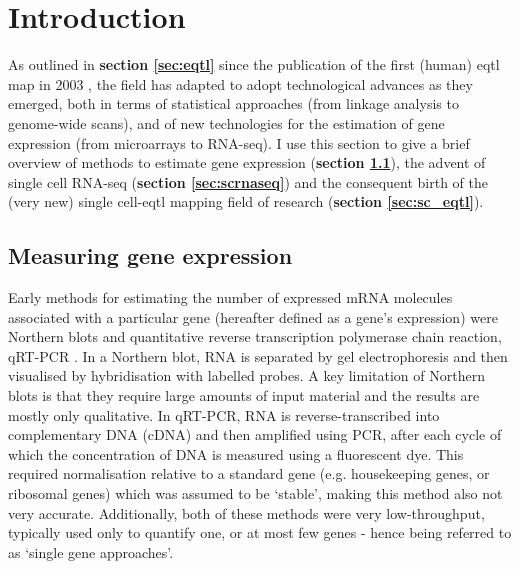 \newpage

\section{Introduction}

As outlined in \textbf{section 
\ref{sec:eqtl}} 
since the publication of the first (human) \gls{eqtl} map in 2003 \cite{schadt2003genetics}, the field has adapted to adopt technological advances as they emerged, both in terms of statistical approaches (from linkage analysis to genome-wide scans), and of new technologies for the estimation of gene expression (from microarrays to RNA-seq).
I use this section to give a brief overview of methods to estimate gene expression (\textbf{section \ref{sec:gene_expression}}), the advent of single cell RNA-seq (\textbf{section \ref{sec:scrnaseq}}) and the consequent birth of the (very new) single cell-\gls{eqtl} mapping field of research (\textbf{section \ref{sec:sc_eqtl}}). 

\subsection{Measuring gene expression}
\label{sec:gene_expression}

Early methods for estimating the number of expressed mRNA molecules associated with a particular gene (hereafter defined as a gene's expression)
were Northern blots \cite{alwine1977method} and quantitative reverse transcription polymerase chain reaction, qRT-PCR \cite{gibson1996novel}. 
In a Northern blot, RNA is separated by gel electrophoresis and then visualised by hybridisation with labelled probes. 
A key limitation of Northern blots is that they require large amounts of input material and the results are mostly only qualitative.
In qRT-PCR, RNA is reverse-transcribed into complementary DNA (cDNA) and then amplified using PCR, after each cycle of which the concentration of DNA is measured using a fluorescent dye. 
This required normalisation relative to a standard gene (e.g. 
housekeeping genes, or 
ribosomal genes) which was assumed to be `stable', making this method also not very accurate.
Additionally, both of these methods were very low-throughput, typically used only to quantify one, or at most few genes - hence being referred to as `single gene approaches'.
\\

